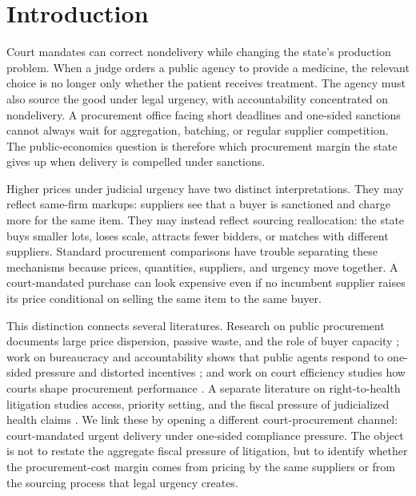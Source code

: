 \section{Introduction}
\label{sec:introduction}

Court mandates can correct nondelivery while changing the state's production problem. When a judge orders a public agency to provide a medicine, the relevant choice is no longer only whether the patient receives treatment. The agency must also source the good under legal urgency, with accountability concentrated on nondelivery. A procurement office facing short deadlines and one-sided sanctions cannot always wait for aggregation, batching, or regular supplier competition. The public-economics question is therefore which procurement margin the state gives up when delivery is compelled under sanctions.

Higher prices under judicial urgency have two distinct interpretations. They may reflect same-firm markups: suppliers see that a buyer is sanctioned and charge more for the same item. They may instead reflect sourcing reallocation: the state buys smaller lots, loses scale, attracts fewer bidders, or matches with different suppliers. Standard procurement comparisons have trouble separating these mechanisms because prices, quantities, suppliers, and urgency move together. A court-mandated purchase can look expensive even if no incumbent supplier raises its price conditional on selling the same item to the same buyer.

This distinction connects several literatures. Research on public procurement documents large price dispersion, passive waste, and the role of buyer capacity \citep{bandiera2009active,best2023procurement,bosio2022public,decarolis2018buyer}; work on bureaucracy and accountability shows that public agents respond to one-sided pressure and distorted incentives \citep{prendergast2007bureaucrats,bandiera2021allocation}; and work on court efficiency studies how courts shape procurement performance \citep{coviello2018court}. A separate literature on right-to-health litigation studies access, priority setting, and the fiscal pressure of judicialized health claims \citep{ferraz2009right,wang2015right,biehl2009will}. We link these by opening a different court-procurement channel: court-mandated urgent delivery under one-sided compliance pressure. The object is not to restate the aggregate fiscal pressure of litigation, but to identify whether the procurement-cost margin comes from pricing by the same suppliers or from the sourcing process that legal urgency creates.

